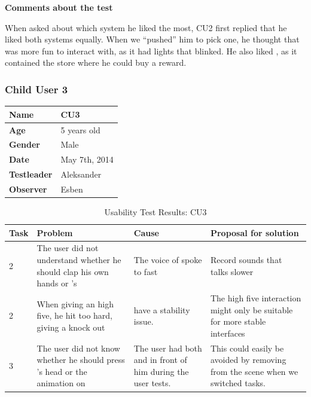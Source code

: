 \textbf{Comments about the test}

When asked about which system he liked the most, CU2 first replied that he liked both systems equally. When we ``pushed'' him to pick one, he thought that \ab{} was more fun to interact with, as it had lights that blinked. He also liked \app{}, as it contained the store where he could buy a reward. 

\subsubsection{Child User 3}
\begin{table}[H]
\centering
\begin{tabular}{| p{4.0cm} | p{4.0cm} |}
\hline
 \textbf{Name} & CU3 \\
 \hline
 \textbf{Age} & 5 years old \\
 \hline 
 \textbf{Gender} & Male \\
 \hline
 \textbf{Date} & May 7th, 2014 \\
 \hline
 \textbf{Testleader} & Aleksander \\
 \hline
 \textbf{Observer} & Esben \\
 \hline
\end{tabular}
\end{table}


\begin{table}[H]
\centering
\begin{tabular}{| p{1.0cm} | p{4.0cm} | p{4.0cm} | p{4.0cm} |}
	\hline
	\textbf{Task} & \textbf{Problem} & \textbf{Cause} & \textbf{Proposal for solution} \\
	\hline
	2 & The user did not understand whether he should clap his own hands or \ab{}'s & The voice of \ab{} spoke to fast & Record sounds that talks slower \\
	\hline
	2 & When giving \ab{} an high five, he hit too hard, giving \ab{} a knock out & \ab{} have a stability issue. & The high five interaction might only be suitable for more stable interfaces \\
	\hline
	3 & The user did not know whether he should press \ab{}'s head or the animation on \app{} & The user had both \ab{} and \app{} in front of him during the user tests. & This could easily be avoided by removing \ab{} from the scene when we switched tasks. \\
	\hline  
\end{tabular}
\caption{Usability Test Results: CU3}
\label{tab:testchild3}
\end{table}

